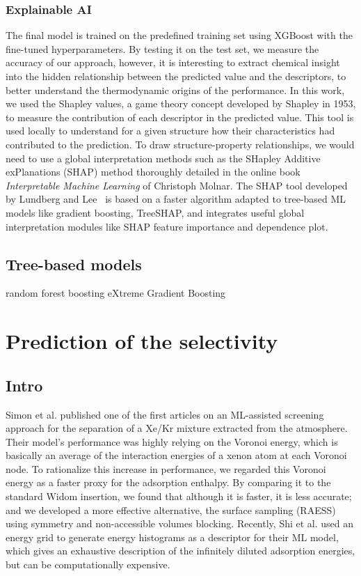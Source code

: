 \documentclass[main]{subfiles}
\begin{document}
\subsubsection{Explainable AI}



The final model is trained on the predefined training set using XGBoost with the fine-tuned hyperparameters. By testing it on the test set, we measure the accuracy of our approach, however, it is interesting to extract chemical insight into the hidden relationship between the predicted value and the descriptors, to better understand the thermodynamic origins of the performance. In this work, we used the Shapley values,\cite{shapley1953value} a game theory concept developed by Shapley in 1953, to measure the contribution of each descriptor in the predicted value. This tool is used locally to understand for a given structure how their characteristics had contributed to the prediction. To draw structure-property relationships, we would need to use a global interpretation methods such as the SHapley Additive exPlanations (SHAP) method thoroughly detailed in the online book \emph{Interpretable Machine Learning} of Christoph Molnar.\cite{molnar2020interpretable} The SHAP tool developed by Lundberg and Lee~\cite{SHAP} is based on a faster algorithm adapted to tree-based ML models like gradient boosting, TreeSHAP, and integrates useful global interpretation modules like SHAP feature importance and dependence plot.

\subsection{Tree-based models}

random forest 
boosting
eXtreme Gradient Boosting



\section{Prediction of the selectivity}

\subsection{Intro}

Simon et al. published one of the first articles on an ML-assisted screening approach for the separation of a Xe/Kr mixture extracted from the atmosphere.\cite{Simon_2015} Their model's performance was highly relying on the Voronoi energy, which is basically an average of the interaction energies of a xenon atom at each Voronoi node.\cite{Rycroft_2009} To rationalize this increase in performance, we regarded this Voronoi energy as a faster proxy for the adsorption enthalpy. By comparing it to the standard Widom insertion, we found that although it is faster, it is less accurate; and we developed a more effective alternative, the surface sampling (RAESS) using symmetry and non-accessible volumes blocking.\cite{Ren_2023} Recently, Shi et al. used an energy grid to generate energy histograms as a descriptor for their ML model, which gives an exhaustive description of the infinitely diluted adsorption energies,\cite{Shi_2023} but can be computationally expensive.
\end{document}
